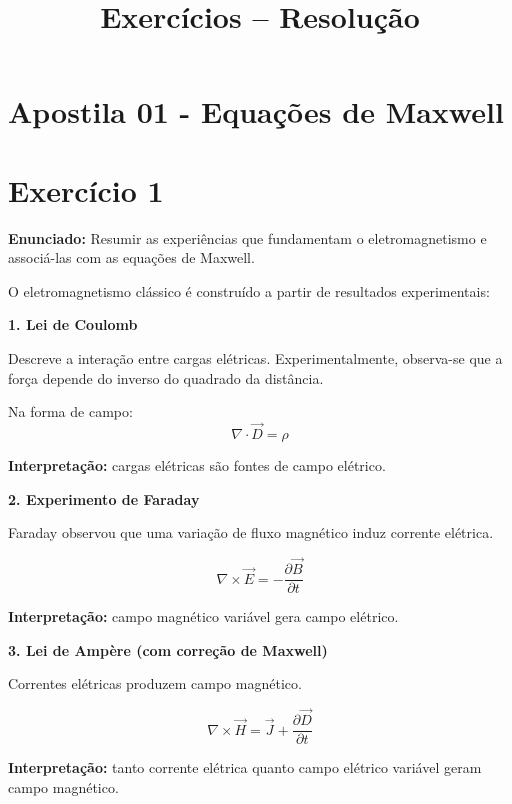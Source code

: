 \documentclass[12pt,a4paper]{article}
\title{\textbf{Exercícios -- Resolução}}
\author{}
\date{}
\begin{document}
\maketitle
\section*{Apostila 01 - Equações de Maxwell}

\section*{Exercício 1}

\textbf{Enunciado:} Resumir as experiências que fundamentam o eletromagnetismo e associá-las com as equações de Maxwell.

O eletromagnetismo clássico é construído a partir de resultados experimentais:

\textbf{1. Lei de Coulomb}

Descreve a interação entre cargas elétricas. Experimentalmente, observa-se que a força depende do inverso do quadrado da distância.

Na forma de campo:
\begin{equation}
\nabla \cdot \vec{D} = \rho
\end{equation}

\textbf{Interpretação:} cargas elétricas são fontes de campo elétrico.

\vspace{0.3cm}

\textbf{2. Experimento de Faraday}

Faraday observou que uma variação de fluxo magnético induz corrente elétrica.

\begin{equation}
\nabla \times \vec{E} = -\frac{\partial \vec{B}}{\partial t}
\end{equation}

\textbf{Interpretação:} campo magnético variável gera campo elétrico.

\vspace{0.3cm}

\textbf{3. Lei de Ampère (com correção de Maxwell)}

Correntes elétricas produzem campo magnético.

\begin{equation}
\nabla \times \vec{H} = \vec{J} + \frac{\partial \vec{D}}{\partial t}
\end{equation}

\textbf{Interpretação:} tanto corrente elétrica quanto campo elétrico variável geram campo magnético.
\end{document}
